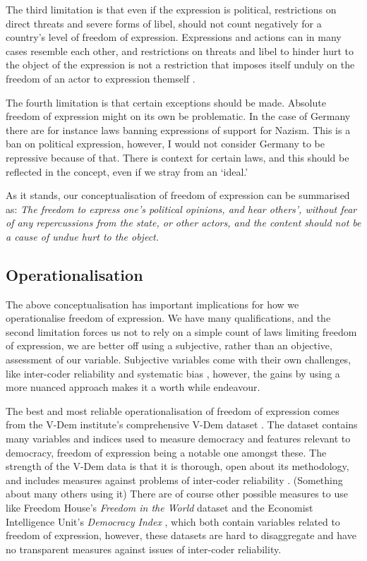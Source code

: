 The third limitation is that even if the expression is political, restrictions on direct threats and severe forms of libel, should not count negatively for a country's level of freedom of expression. Expressions and actions can in many cases resemble each other, and restrictions on threats and libel to hinder hurt to the object of the expression is not a restriction that imposes itself unduly on the freedom of an actor to expression themself \citep[pp. 81-82]{mill_liberty_2010}. 

The fourth limitation is that certain exceptions should be made. Absolute freedom of expression might on its own be problematic. In the case of Germany there are for instance laws banning expressions of support for Nazism. This is a ban on political expression, however, I would not consider Germany to be repressive because of that. There is context for certain laws, and this should be reflected in the concept, even if we stray from an `ideal.'  

As it stands, our conceptualisation of freedom of expression can be summarised as: \textit{The freedom to express one's  political opinions, and hear others',  without fear of any repercussions from the state, or other actors, and the content should not be a cause of undue hurt to the object.}

\subsection{Operationalisation}
The above conceptualisation has important implications for how we operationalise freedom of expression. We have many qualifications, and the second limitation forces us not to rely on a simple count of laws limiting freedom of expression, we are better off using a subjective, rather than an objective, assessment of our variable. Subjective variables come with their own challenges, like inter-coder reliability and systematic bias \citep[for a discussion see:][]{little_measuring_2024, miller_how_2024}, however, the gains by using a more nuanced approach makes it a worth while endeavour.

The best and most reliable operationalisation of freedom of expression comes from the V-Dem institute's comprehensive V-Dem dataset \citep{coppedge_v-dem_2025}. The dataset contains many variables and indices used to measure democracy and features relevant to democracy, freedom of expression being a notable one amongst these. The strength of the V-Dem data is that it is thorough, open about its methodology, and includes measures against problems of inter-coder reliability \citep{coppedge_v-dem_2024-2}. (Something about many others using it) There are of course other possible measures to use like Freedom House's \textit{Freedom in the World} dataset \citep{freedom_house_freedom_2024} and the Economist Intelligence Unit's \textit{Democracy Index} \citep{economist_intelligence_unit_democracy_2024}, which both contain variables related to freedom of expression, however, these datasets are hard to disaggregate and have no transparent measures against issues of inter-coder reliability.


